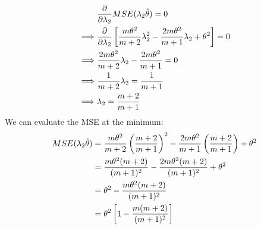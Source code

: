 \documentclass[12pt]{article}
\begin{document}
\begin{align*}
             &
    \frac{\partial}{\partial \lambda_2} MSE(\lambda_2 \hat{\theta}) = 0                                                                           \\
    \implies &
    \frac{\partial}{\partial \lambda_2} \left[ \frac{m \theta^{2}}{m+2} \lambda_2^2 - \frac{2m \theta^2}{m+1} \lambda_2 + \theta^2 \right] = 0 \\
    \implies &
    \frac{2m \theta^{2}}{m+2} \lambda_2 - \frac{2m \theta^2}{m+1} = 0                                                                          \\
    \implies &
    \frac{1}{m+2} \lambda_2 = \frac{1}{m+1}                                                                                                    \\
    \implies &
    \lambda_2 = \frac{m+2}{m+1}                                                                                                                \\
\end{align*}
We can evaluate the MSE at the minimum:
\begin{align*}
    MSE(\lambda_2 \hat{\theta})
     & = \frac{m \theta^{2}}{m+2} \left(\frac{m+2}{m+1}\right)^2 - \frac{2m \theta^2}{m+1} \left(\frac{m+2}{m+1}\right) + \theta^2 \\
     & = \frac{m \theta^{2} (m+2)}{(m+1)^2} - \frac{2m \theta^2 (m+2)}{(m+1)^2} + \theta^2                                         \\
     & = \theta^2 - \frac{m \theta^2 (m+2)}{(m+1)^2}                                                                               \\
     & = \theta^2 \left[ 1 - \frac{m (m+2)}{(m+1)^2} \right]                                                                               \\
\end{align*}



\end{document}
